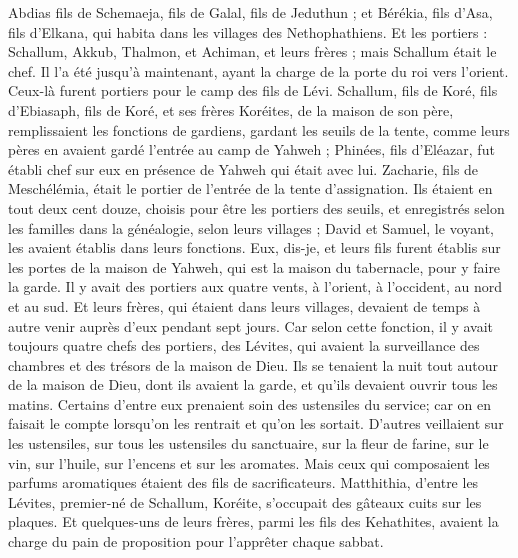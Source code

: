 \begin{multicols}{2}
Abdias fils de Schemaeja, fils de Galal, fils de Jeduthun ; et Bérékia, fils d'Asa, fils d'Elkana, qui habita dans les villages des Nethophathiens.
Et les portiers : Schallum, Akkub, Thalmon, et Achiman, et leurs frères ; mais Schallum était le chef.
Il l'a été jusqu'à maintenant, ayant la charge de la porte du roi vers l’orient. Ceux-là furent portiers pour le camp des fils de Lévi.
Schallum, fils de Koré, fils d'Ebiasaph, fils de Koré, et ses frères Koréites, de la maison de son père, remplissaient les fonctions de gardiens, gardant les seuils de la tente, comme leurs pères en avaient gardé l'entrée au camp de Yahweh ;
Phinées, fils d'Eléazar, fut établi chef sur eux en présence de Yahweh qui était avec lui.
Zacharie, fils de Meschélémia, était le portier de l'entrée de la tente d'assignation.
Ils étaient en tout deux cent douze, choisis pour être les portiers des seuils, et enregistrés selon les familles dans la généalogie, selon leurs villages ; David et Samuel, le voyant, les avaient établis dans leurs fonctions.
Eux, dis-je, et leurs fils furent établis sur les portes de la maison de Yahweh, qui est la maison du tabernacle, pour y faire la garde.
Il y avait des portiers aux quatre vents, à l'orient, à l'occident, au nord et au sud.
Et leurs frères, qui étaient dans leurs villages, devaient de temps à autre venir auprès d’eux pendant sept jours.
Car selon cette fonction, il y avait toujours quatre chefs des portiers, des Lévites, qui avaient la surveillance des chambres et des trésors de la maison de Dieu.
Ils se tenaient la nuit tout autour de la maison de Dieu, dont ils avaient la garde, et qu’ils devaient ouvrir tous les matins.
Certains d’entre eux prenaient soin des ustensiles du service; car on en faisait le compte lorsqu'on les rentrait et qu'on les sortait.
D’autres veillaient sur les ustensiles, sur tous les ustensiles du sanctuaire, sur la fleur de farine, sur le vin, sur l'huile, sur l'encens et sur les aromates.
Mais ceux qui composaient les parfums aromatiques étaient des fils de sacrificateurs.
Matthithia, d'entre les Lévites, premier-né de Schallum, Koréite, s’occupait des gâteaux cuits sur les plaques.
Et quelques-uns de leurs frères, parmi les fils des Kehathites, avaient la charge du pain de proposition  pour l'apprêter chaque sabbat.

\end{multicols}
